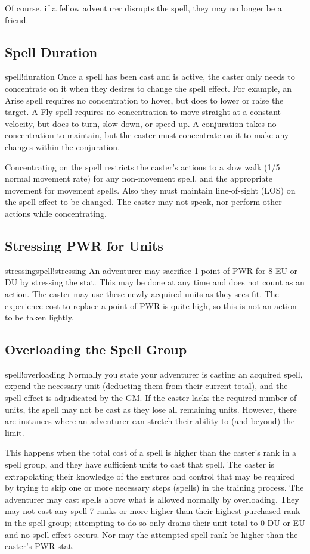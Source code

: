 Of course, if a fellow adventurer disrupts the spell, they may no longer be a friend.
\subsection{Spell Duration}
spell!duration
Once a spell has been cast and is active, the caster only needs to concentrate on it when they desires to change the spell effect. For example, an Arise spell requires no concentration to hover, but does to lower or raise the target. A Fly spell requires no concentration to move straight at a constant velocity, but does to turn, slow down, or speed up. A conjuration takes no concentration to maintain, but the caster must concentrate on it to make any changes within the conjuration.

Concentrating on the spell restricts the caster's actions to a slow walk (1/5 normal movement rate) for any non-movement spell, and the appropriate movement for movement spells. Also they must maintain line-of-sight (LOS) on the spell effect to be changed. The caster may not speak, nor perform other actions while concentrating.
\subsection{Stressing PWR for Units}
stressingspell!stressing
An adventurer may sacrifice 1 point of PWR for 8 EU or DU by stressing the stat. This may be done at any time and does not count as an action. The caster may use these newly acquired units as they sees fit. The experience cost to replace a point of PWR is quite high, so this is not an action to be taken lightly.
\subsection{Overloading the Spell Group}
spell!overloading
Normally you state your adventurer is casting an acquired spell, expend the necessary unit (deducting them from their current total), and the spell effect is adjudicated by the GM. If the caster lacks the required number of units, the spell may not be cast as they lose all remaining units. However, there are instances where an adventurer can stretch their ability to (and beyond) the limit.

This happens when the total cost of a spell is higher than the caster's rank in a spell group, and they have sufficient units to cast that spell. The caster is extrapolating their knowledge of the gestures and control that may be required by trying to skip one or more necessary steps (spells) in the training process. The adventurer may cast spells above what is allowed normally by overloading. They may not cast any spell 7 ranks or more higher than their highest purchased rank in the spell group; attempting to do so only drains their unit total to 0 DU or EU and no spell effect occurs. Nor may the attempted spell rank be higher than the caster's PWR stat.

